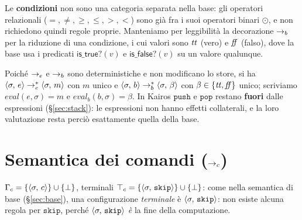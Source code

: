 \medskip
\noindent
Le \textbf{condizioni} non sono una categoria separata nella base: gli
operatori relazionali ($=,\neq,\geq,\leq,>,<$) sono già fra i suoi operatori
binari $\odot$, e non richiedono quindi regole proprie. Manteniamo per
leggibilità la decorazione $\to_b$ per la riduzione di una condizione, i cui
valori sono $\mathit{tt}$ (vero) e $\mathit{ff}$ (falso), dove la base usa i predicati
$\mathsf{is\_true?}(v)$ e $\mathsf{is\_false?}(v)$ su un valore qualunque.

\medskip
\noindent
Poiché $\to_e$ e $\to_b$ sono deterministiche e non modificano lo store, si ha
$\langle \sigma,\, e \rangle \to_e^{*} \langle \sigma,\, m \rangle$ con $m$ unico e
$\langle \sigma,\, b \rangle \to_b^{*} \langle \sigma,\, \beta \rangle$ con $\beta \in \{\mathit{tt},\mathit{ff}\}$
unico; scriviamo $\mathit{eval}(e,\sigma) = m$ e
$\mathit{eval}_b(b,\sigma) = \beta$. In Kairos $\mathtt{push}$ e
$\mathtt{pop}$ restano \textbf{fuori} dalle espressioni
(\S\ref{sec:stack}): le espressioni non hanno effetti collaterali, e la loro
valutazione resta perciò esattamente quella della base.

\section{Semantica dei comandi ($\to_c$)}
\label{sec:cmd}

$\Gamma_c = \{\langle \sigma,\, c \rangle\} \cup \{\bot\}$, terminali
$\top_c = \{\langle \sigma,\, \mathtt{skip} \rangle\} \cup \{\bot\}$: come nella semantica
di base (\S\ref{sec:base}), una configurazione \emph{terminale} è
$\langle \sigma,\, \mathtt{skip} \rangle$: non esiste alcuna regola per $\mathtt{skip}$,
perché $\langle \sigma,\, \mathtt{skip} \rangle$ \emph{è} la fine della computazione.

